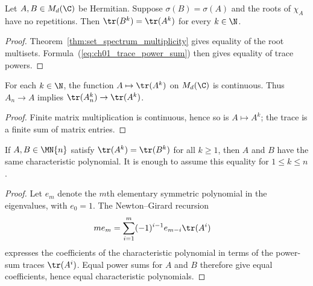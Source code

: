 \begin{theorem}
    \label{thm:hermitian_set_spectrum_multiplicity}
    \leanok
    Let $A,B\in M_d(\C)$ be Hermitian. Suppose
    $\sigma(B)=\sigma(A)$ and the roots of $\chi_A$ have no repetitions.
    Then $\tr(B^k)=\tr(A^k)$ for every $k\in\N$.
\end{theorem}

\begin{proof}\leanok
    Theorem~\ref{thm:set_spectrum_multiplicity} gives equality of the root
    multisets. Formula~(\ref{eq:ch01_trace_power_sum}) then gives equality of
    trace powers.
\end{proof}

\begin{theorem}
    \label{thm:matrix_trace_power_continuity}
    \leanok
    For each $k\in\N$, the function
    $A\mapsto\tr(A^k)$ on $M_d(\C)$ is continuous. Thus $A_n\to A$ implies
    $\tr(A_n^k)\to\tr(A^k)$.
\end{theorem}

\begin{proof}\leanok
    Finite matrix multiplication is continuous, hence so is $A\mapsto A^k$;
    the trace is a finite sum of matrix entries.
\end{proof}

\begin{theorem}\label{thm:newton_girard}
    \leanok
    If $A, B \in \MN{n}$ satisfy
    $\tr(A^k) = \tr(B^k)$ for all $k \ge 1$,
    then $A$ and $B$ have the same characteristic polynomial.
    It is enough to assume this equality for $1 \le k \le n$.
\end{theorem}

\begin{proof}
    \leanok
    Let $e_m$ denote the $m$th elementary symmetric polynomial in the
    eigenvalues, with $e_0 = 1$. The Newton--Girard recursion
    \begin{align}
        m e_m
         & = \sum_{i=1}^m (-1)^{i-1} e_{m-i} \tr(A^i)
    \end{align}
    expresses the coefficients of the characteristic polynomial in terms
    of the power-sum traces $\tr(A^i)$. Equal power sums for $A$ and $B$
    therefore give equal coefficients, hence equal characteristic
    polynomials.
\end{proof}

